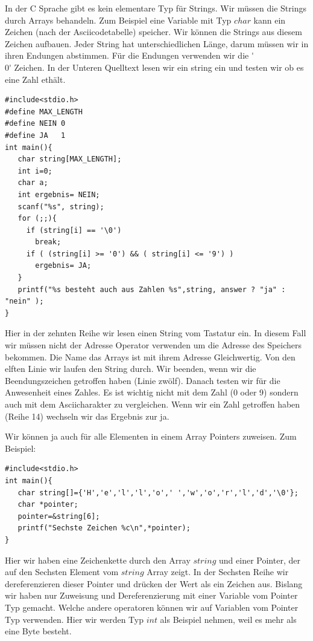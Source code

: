 In der C Sprache gibt es kein elementare Typ für Strings. Wir müssen die Strings durch Arrays behandeln.
Zum Beispiel eine Variable mit Typ $char$ kann ein Zeichen (nach der Asciicodetabelle) speicher. Wir können
die Strings aus diesem Zeichen aufbauen. Jeder String hat unterschiedlichen Länge, darum müssen wir
in ihren Endungen abstimmen. Für die Endungen verwenden wir die \'{}\\0\'{} Zeichen. In der Unteren 
Quelltext lesen wir ein string ein und testen wir ob es eine Zahl ethält.
\begin{lstlisting}
#include<stdio.h>
#define MAX_LENGTH
#define NEIN 0
#define JA   1
int main(){
   char string[MAX_LENGTH];
   int i=0;
   char a;
   int ergebnis= NEIN;
   scanf("%s", string);
   for (;;){
     if (string[i] == '\0')
       break;
     if ( (string[i] >= '0') && ( string[i] <= '9') )
       ergebnis= JA;
   }
   printf("%s besteht auch aus Zahlen %s",string, answer ? "ja" : "nein" );
}
\end{lstlisting}
Hier in der zehnten Reihe wir lesen einen String vom Tastatur ein. In diesem Fall
wir müssen nicht der Adresse Operator verwenden um die Adresse des Speichers bekommen.
Die Name das Arrays ist mit ihrem Adresse Gleichwertig. Von den elften Linie wir laufen
den String durch. Wir beenden, wenn wir die Beendungszeichen getroffen haben (Linie zwölf).
Danach testen wir für die Anwesenheit eines Zahles. Es ist wichtig nicht mit dem Zahl (0 
oder 9) sondern auch mit dem Asciicharakter zu vergleichen. Wenn wir ein Zahl 
getroffen haben (Reihe 14) wechseln wir das Ergebnis zur ja.

Wir können ja auch für alle Elementen in einem Array Pointers zuweisen. Zum Beispiel:
\begin{lstlisting}
#include<stdio.h>
int main(){
   char string[]={'H','e','l','l','o',' ','w','o','r','l','d','\0'};
   char *pointer;
   pointer=&string[6];
   printf("Sechste Zeichen %c\n",*pointer);
}
\end{lstlisting} 
Hier wir haben eine Zeichenkette durch den Array $string$ und einer Pointer, der auf den Sechsten Element vom 
$string$ Array zeigt. In der Sechsten Reihe wir dereferenzieren dieser Pointer und drücken der Wert als ein 
Zeichen aus. Bislang wir haben nur Zuweisung und Dereferenzierung mit einer Variable vom Pointer Typ gemacht.
Welche andere operatoren können wir auf Variablen vom Pointer Typ verwenden. Hier wir werden Typ $int$ als Beispiel
nehmen, weil es mehr als eine Byte besteht.

